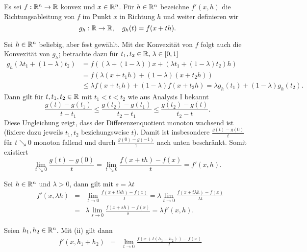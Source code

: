 Es sei $f:\mathbb{R}^n\to \mathbb{R}$ konvex und $x\in \mathbb{R}^n$. Für $h\in \mathbb{R}^n$ bezeichne $f'(x,h)$ die Richtungsableitung von $f$ im Punkt $x$ in Richtung $h$ und
weiter definieren wir 
\begin{displaymath}
 g_h:\mathbb{R}\to\mathbb{R},\quad g_h(t)=f(x+th).
\end{displaymath}

\begin{compactenum}[(i)]
 \item %
 Sei $h\in\mathbb{R}^n$ beliebig, aber fest gewählt. Mit der Konvexität von $f$ folgt auch die Konvexität von $g_h$;
 betrachte dazu für $t_1,t_2\in \mathbb{R}, \, \lambda\in[0,1]$
 \begin{align*}
  g_h(\lambda t_1+(1-\lambda)t_2)&= f((\lambda+(1-\lambda))x+(\lambda t_1+(1-\lambda)t_2)h)\\
  &=f(\lambda(x+t_1h)+(1-\lambda)(x+t_2h))\\
  &\leq \lambda f(x+t_1h)+(1-\lambda)f(x+t_2h)=\lambda g_h(t_1)+(1-\lambda)g_h(t_2).
 \end{align*}
 Dann gilt für $t,t_1,t_2\in \mathbb{R}$ mit $t_1<t<t_2$ wie aus Analysis I bekannt
 \begin{displaymath}
  \frac{g(t)-g(t_1)}{t-t_1}\leq\frac{g(t_2)-g(t_1)}{t_2-t_1}\leq\frac{g(t_2)-g(t)}{t_2-t}.
 \end{displaymath}
Diese Ungleichung zeigt, dass der Differenzenquotient monoton wachsend ist (fixiere dazu jeweils $t_1,t_2$ beziehungsweise $t$). Damit ist insbesondere $\frac{g(t)-g(0)}{t}$ für $t\searrow0$ monoton fallend und durch $\frac{g(0)-g(-1)}{1}$ nach unten beschränkt.
 Somit existiert 
 \begin{displaymath}
  \lim_{t\searrow 0} \frac{g(t)-g(0)}{t}=\lim_{t\searrow 0}\frac{f(x+th)-f(x)}{t}=f'(x,h).
 \end{displaymath}
 \item Sei $h\in\mathbb{R}^n$ und $\lambda>0$, dann gilt mit $s=\lambda t$
 \begin{align*}
  &f'(x,\lambda h)&=&\lim_{t\to 0}\frac{f(x+t\lambda h)-f(x)}{t}=\lambda\lim_{t\to 0}\frac{f(x+t\lambda h)-f(x)}{\lambda t}\\
  &&=&\lambda\lim_{s\to 0}\frac{f(x+s h)-f(x)}{s}=\lambda f'(x,h).
 \end{align*}
 \item Seien $h_1, h_2\in\mathbb{R}^n$. Mit (ii) gilt dann
 \begin{align*}
  &f'(x,h_1+h_2)&=&\lim_{t\to 0} \frac{f(x+t(h_1+h_2))-f(x)}{t}\\

\end{align*}
\end{compactenum}
